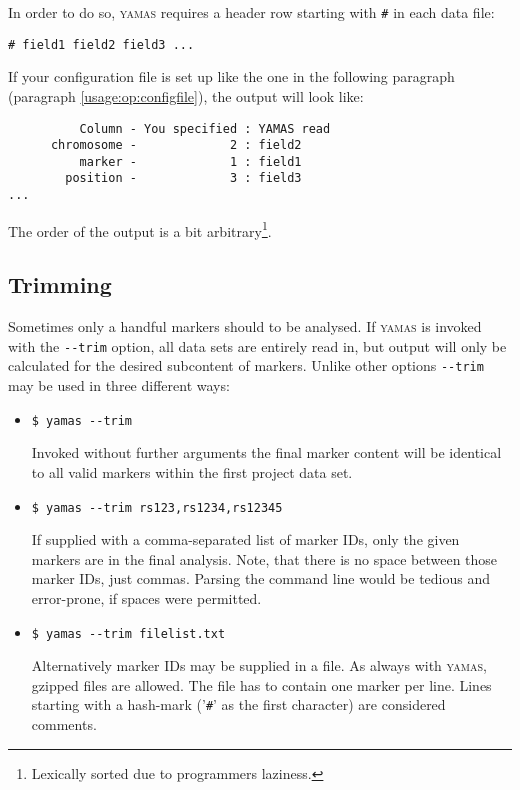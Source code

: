In order to do so, \textsc{yamas} requires a header row starting with \verb+#+ in each data file:
\begin{lstlisting}
# field1 field2 field3 ...
\end{lstlisting}

If your configuration file is set up like the one in the following paragraph (paragraph \ref{usage:op:configfile}), the output will look like:
\begin{lstlisting}
          Column - You specified : YAMAS read
      chromosome -             2 : field2
          marker -             1 : field1
        position -             3 : field3
...
\end{lstlisting}
The order of the output is a bit arbitrary\footnote{Lexically sorted due to programmers laziness.}.

\subsection{Trimming}
\label{usage:op:trimming}
Sometimes only a handful markers should to be analysed. If \textsc{yamas} is invoked with the \verb+--trim+ option, all data sets are entirely read in, but output will only be calculated for the desired subcontent of markers. Unlike other options \verb+--trim+ may be used in three different ways:

\begin{itemize}
 \item \begin{lstlisting}[style=shell]
$ yamas --trim
\end{lstlisting} Invoked without further arguments the final marker content will be identical to all valid markers within the first project data set.
 \item \begin{lstlisting}[style=shell]
$ yamas --trim rs123,rs1234,rs12345
\end{lstlisting} If supplied with a comma-separated list of marker IDs, only the given markers are in the final analysis. Note, that there is no space between those marker IDs, just commas. Parsing the command line would be tedious and error-prone, if spaces were permitted.
 \item \begin{lstlisting}[style=shell]
$ yamas --trim filelist.txt
\end{lstlisting} Alternatively marker IDs may be supplied in a file. As always with \textsc{yamas}, gzipped files are allowed. The file has to contain one marker per line. Lines starting with a hash-mark ('\verb+#+' as the first character) are considered comments.
\end{itemize}

